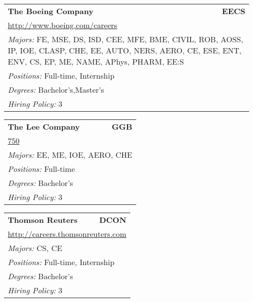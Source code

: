 \documentclass[twoside]{article}
\begin{document}
\begin{center}
\begin{multicols}{3}
\begin{FlushLeft}
\begin{minipage}{.9\columnwidth}
\end{minipage}
 
\begin{minipage}{.9\columnwidth}\begin{tabularx}{.95\columnwidth}{Xr}
                 {\Large\bf The Boeing Company} & {\Large\bf EECS}\\
    \multicolumn{2}{p{.95\columnwidth}}{\url{http://www.boeing.com/careers}}\\
    \multicolumn{2}{p{.95\columnwidth}}{\emph{Majors:} FE, MSE, DS, ISD, CEE, MFE, BME, CIVIL, ROB, AOSS, IP, IOE, CLASP, CHE, EE, AUTO, NERS, AERO, CE, ESE, ENT, ENV, CS, EP, ME, NAME, APhys, PHARM, EE:S}\\
    \multicolumn{2}{p{.95\columnwidth}}{\emph{Positions:} Full-time, Internship}\\
    \multicolumn{2}{p{.95\columnwidth}}{\emph{Degrees:} Bachelor's,Master's}\\
    \multicolumn{2}{p{.95\columnwidth}}{\emph{Hiring Policy:} 3}\\
    \end{tabularx}
    
\end{minipage}
 
\begin{minipage}{.9\columnwidth}\begin{tabularx}{.95\columnwidth}{Xr}
                 {\Large\bf The Lee Company} & {\Large\bf GGB}\\
    \multicolumn{2}{p{.95\columnwidth}}{\url{750}}\\
    \multicolumn{2}{p{.95\columnwidth}}{\emph{Majors:} EE, ME, IOE, AERO, CHE}\\
    \multicolumn{2}{p{.95\columnwidth}}{\emph{Positions:} Full-time}\\
    \multicolumn{2}{p{.95\columnwidth}}{\emph{Degrees:} Bachelor's}\\
    \multicolumn{2}{p{.95\columnwidth}}{\emph{Hiring Policy:} 3}\\
    \end{tabularx}
    
\end{minipage}
 
\begin{minipage}{.9\columnwidth}\begin{tabularx}{.95\columnwidth}{Xr}
                 {\Large\bf Thomson Reuters} & {\Large\bf DCON}\\
    \multicolumn{2}{p{.95\columnwidth}}{\url{http://careers.thomsonreuters.com}}\\
    \multicolumn{2}{p{.95\columnwidth}}{\emph{Majors:} CS, CE}\\
    \multicolumn{2}{p{.95\columnwidth}}{\emph{Positions:} Full-time, Internship}\\
    \multicolumn{2}{p{.95\columnwidth}}{\emph{Degrees:} Bachelor's}\\
    \multicolumn{2}{p{.95\columnwidth}}{\emph{Hiring Policy:} 3}\\
    \end{tabularx}
    

\end{minipage}
\end{FlushLeft}
\end{multicols}
\end{center}
\end{document}
